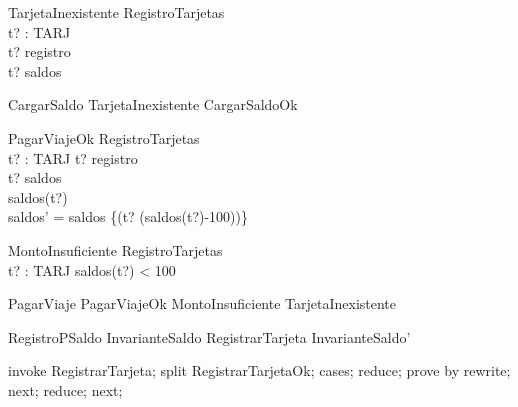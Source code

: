 \begin{schema}{TarjetaInexistente}
    \Xi RegistroTarjetas \\
    t? : TARJ \\
\where
    t? \notin registro \\ 
    t? \notin \dom saldos
\end{schema}

\begin{zed}
    CargarSaldo  TarjetaInexistente \lor CargarSaldoOk \\
\end{zed}

\begin{schema}{PagarViajeOk}
    \Delta RegistroTarjetas \\
    t? : TARJ 
\where
    t? \in registro \\
    t? \in \dom saldos \\
    saldos(t?)  \\
    saldos' = saldos \cup \{(t? \mapsto (saldos(t?)-100))\} 
\end{schema}

\begin{schema}{MontoInsuficiente}
    \Xi RegistroTarjetas \\
    t? : TARJ 
\where
    saldos(t?) < 100 \\
\end{schema}

\begin{zed}
    PagarViaje  PagarViajeOk \lor MontoInsuficiente \lor TarjetaInexistente \\
\end{zed}

\begin{theorem}{RegistroPSaldo}
    InvarianteSaldo \land  RegistrarTarjeta \implies  InvarianteSaldo'
\end{theorem}

\begin{zproof}[RegistroPSaldo]
    invoke RegistrarTarjeta;
    split RegistrarTarjetaOk;
    cases;
    reduce;
    prove by rewrite;
    next;
    reduce;
    next;
\end{zproof}
